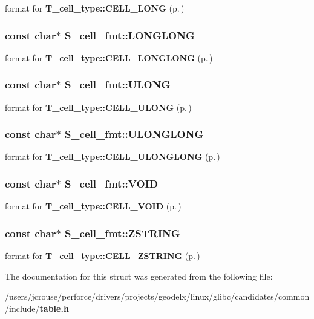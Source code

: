 format for {\bf T\_\-cell\_\-type::CELL\_\-LONG} {\rm (p.\,\pageref{table_8h_a37a16})} 
\subsubsection{\setlength{\rightskip}{0pt plus 5cm}const char$\ast$ S\_\-cell\_\-fmt::LONGLONG}\label{structS__cell__fmt_m3}


format for {\bf T\_\-cell\_\-type::CELL\_\-LONGLONG} {\rm (p.\,\pageref{table_8h_a37a18})} 
\subsubsection{\setlength{\rightskip}{0pt plus 5cm}const char$\ast$ S\_\-cell\_\-fmt::ULONG}\label{structS__cell__fmt_m2}


format for {\bf T\_\-cell\_\-type::CELL\_\-ULONG} {\rm (p.\,\pageref{table_8h_a37a17})} 
\subsubsection{\setlength{\rightskip}{0pt plus 5cm}const char$\ast$ S\_\-cell\_\-fmt::ULONGLONG}\label{structS__cell__fmt_m4}


format for {\bf T\_\-cell\_\-type::CELL\_\-ULONGLONG} {\rm (p.\,\pageref{table_8h_a37a19})} 
\subsubsection{\setlength{\rightskip}{0pt plus 5cm}const char$\ast$ S\_\-cell\_\-fmt::VOID}\label{structS__cell__fmt_m5}


format for {\bf T\_\-cell\_\-type::CELL\_\-VOID} {\rm (p.\,\pageref{table_8h_a37a20})} 
\subsubsection{\setlength{\rightskip}{0pt plus 5cm}const char$\ast$ S\_\-cell\_\-fmt::ZSTRING}\label{structS__cell__fmt_m6}


format for {\bf T\_\-cell\_\-type::CELL\_\-ZSTRING} {\rm (p.\,\pageref{table_8h_a37a21})} 

The documentation for this struct was generated from the following file:\begin{CompactItemize}
\item 
/users/jcrouse/perforce/drivers/projects/geodelx/linux/glibc/candidates/common/include/{\bf table.h}\end{CompactItemize}
